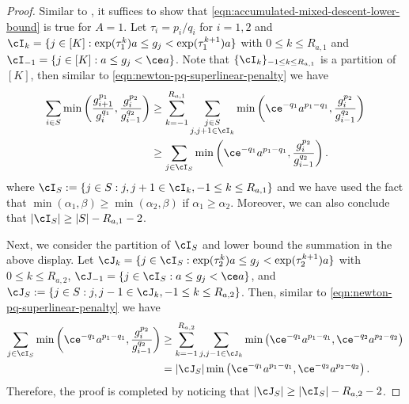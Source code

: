 \begin{proof}%
    Similar to , it suffices to show that \eqref{eqn:accumulated-mixed-descent-lower-bound} is true for $A = 1$.
    Let $\tau_i = p_i/q_i$ for $i = 1, 2$ and $\cI_k = \{ j \in [K] : \exp(\tau_1^{k}) a \leq g_j < \exp(\tau_1^{k+1}) a \}$ with $0 \leq k \leq R_{a,1}$ and $\cI_{-1} = \{ j \in [K] : a \leq g_j < \ce a \}$. 
    Note that $\{ \cI_k \}_{-1 \leq k \leq R_{a,1}}$ is a partition of $[K]$, then similar to \eqref{eqn:newton-pq-superlinear-penalty} we have
    \begin{align*}
        \sum_{i\in S} 
        \min \left ( 
            \frac{g_{i+1}^{p_1}}{g_{i}^{q_1}},
            \frac{g_{i}^{p_2}}{g_{i-1}^{q_2}} 
        \right )  
        &\geq 
        \sum_{k=-1}^{R_{a,1}} 
        \sum_{\substack{j \in S \\j, j+1 \in \cI_k} }
        \min \left ( 
            \ce^{-q_1}a^{p_1 - q_1},
            \frac{g_{i}^{p_2}}{g_{i-1}^{q_2}} 
        \right ) \\
        &\geq \sum_{j \in \cI_S}
        \min \left ( 
           \ce^{-q_1} a^{p_1 - q_1},
            \frac{g_{i}^{p_2}}{g_{i-1}^{q_2}} 
        \right )
        .
    \end{align*}
    where $\cI_S := \{ j \in S : j, j + 1 \in \cI_k, -1 \leq k \leq R_{a,1} \}$ and we have used the fact that $\min(\alpha_1, \beta) \geq \min(\alpha_2, \beta)$ if $\alpha_1 \geq \alpha_2$.
    Moreover, we can also conclude that $|\cI_S| \geq |S| - R_{a,1} - 2$.

    Next, we consider the partition of $\cI_S$ and lower bound the summation in the above display.
    Let $\cJ_k = \{ j \in \cI_S : \exp(\tau_2^k)a \leq g_j < \exp(\tau_2^{k+1})a \}$ with $0 \leq k \leq R_{a,2}$, $\cJ_{-1} = \{ j \in \cI_S : a \leq g_j < \ce a \}$, and $\cJ_S := \{ j \in S : j, j - 1 \in \cJ_k, -1 \leq k \leq R_{a,2} \}$. 
    Then, similar to \eqref{eqn:newton-pq-superlinear-penalty} we have
    \begin{align*}
        \sum_{j \in \cI_S}
        \min \left ( 
            \ce^{-q_1} a^{p_1 - q_1},
            \frac{g_{i}^{p_2}}{g_{i-1}^{q_2}} 
        \right ) 
        &\geq 
        \sum_{k=-1}^{R_{a,2}} 
        \sum_{j, j-1 \in \cJ_k} 
        \min \left ( 
           \ce^{-q_1} a^{p_1 - q_1},
           \ce^{-q_2} a^{p_2 - q_2}
        \right )
         \\
        &=
        |\cJ_S| \min \left ( 
            \ce^{-q_1}a^{p_1 - q_1},
            \ce^{-q_2}a^{p_2 - q_2}
        \right ).
    \end{align*}
    Therefore, the proof is completed by noticing that $|\cJ_S| \geq |\cI_S| - R_{a,2} - 2$.
\end{proof}
